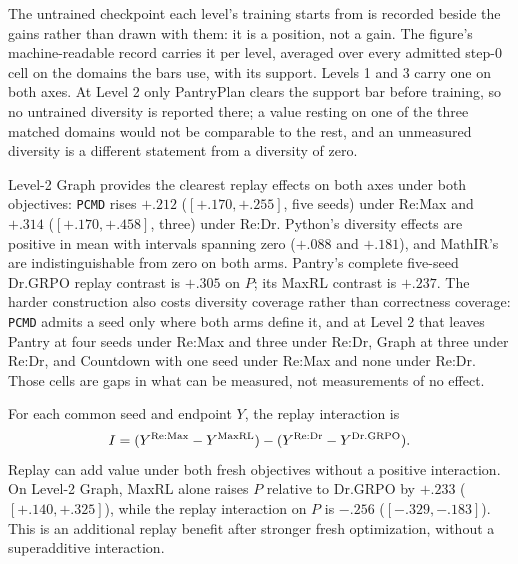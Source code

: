\documentclass{article}
\newcommand{\1}{\mathbf 1}
\newcommand{\pmd}{\texttt{PCMD}}
\theoremstyle{remark}
\theoremstyle{definition}
\theoremstyle{plain}
\begin{document}
The untrained checkpoint each level's training starts from is recorded beside
the gains rather than drawn with them: it is a position, not a gain. The figure's machine-readable record carries it per level, averaged over every
admitted step-0 cell on the domains the bars use, with its support. Levels 1 and 3 carry one on both
axes. At Level 2 only PantryPlan clears the support bar before training, so no
untrained diversity is reported there; a value resting on one of the three
matched domains would not be comparable to the rest, and an unmeasured diversity
is a different statement from a diversity of zero.

Level-2 Graph provides the clearest replay effects on both axes under both
objectives: \pmd{} rises $+.212$ ($[+.170,+.255]$, five seeds) under Re:Max and
$+.314$ ($[+.170,+.458]$, three) under Re:Dr. Python's diversity effects are
positive in mean with intervals spanning zero ($+.088$ and $+.181$), and
MathIR's are indistinguishable from zero on both arms. Pantry's complete
five-seed Dr.GRPO replay contrast is $+.305$ on $P$; its MaxRL contrast is
$+.237$. The harder construction also costs diversity coverage rather than
correctness coverage: \pmd{} admits a seed only where both arms define it, and
at Level 2 that leaves Pantry at four seeds under Re:Max and three under Re:Dr,
Graph at three under Re:Dr, and Countdown with one seed under Re:Max and none
under Re:Dr. Those cells are gaps in what can be measured, not measurements of
no effect.

For each common seed and endpoint $Y$, the replay interaction is
\[
 I=(Y^{\rm Re:Max}-Y^{\rm MaxRL})
    -(Y^{\rm Re:Dr}-Y^{\rm Dr.GRPO}).
\]
Replay can add value under both fresh objectives without a positive
interaction. On Level-2 Graph, MaxRL alone raises $P$ relative to Dr.GRPO
by $+.233$ ($[+.140,+.325]$), while the replay interaction on $P$ is
$-.256$ ($[-.329,-.183]$). This is an additional replay benefit after
stronger fresh optimization, without a superadditive interaction.
\end{document}
